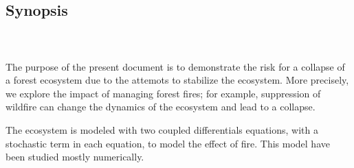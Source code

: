 \documentclass{article}
\begin{document}




\subsection*{Synopsis}

\paragraph{\\}

The purpose of the present document is to demonstrate the risk for a collapse of a forest ecosystem due to the attemots to stabilize the ecosystem. More precisely, we explore the impact of managing forest fires; for example, suppression of wildfire can change the dynamics of the ecosystem and lead to a collapse.

The ecosystem is modeled with two coupled differentials equations, with a stochastic term in each equation, to model the effect of fire. This model have been studied mostly numerically.
\end{document}
